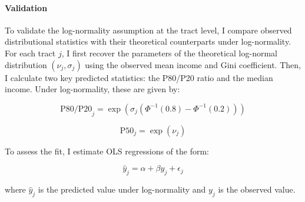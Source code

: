 \paragraph{Validation} To validate the log-normality assumption at the tract level, I compare observed distributional statistics with their theoretical counterparts under log-normality. For each tract $j$, I first recover the parameters of the theoretical log-normal distribution $(\nu_j, \sigma_j)$ using the observed mean income and Gini coefficient. Then, I calculate two key predicted statistics: the P80/P20 ratio and the median income. Under log-normality, these are given by:

\begin{equation}
\text{P80/P20}_j = \exp(\sigma_j(\Phi^{-1}(0.8) - \Phi^{-1}(0.2)))
\end{equation}

\begin{equation}
\text{P50}_j = \exp(\nu_j)
\end{equation}

To assess the fit, I estimate OLS regressions of the form:

\begin{equation}
\hat{y}_j = \alpha + \beta y_j + \epsilon_j
\end{equation}

where $\hat{y}_j$ is the predicted value under log-normality and $y_j$ is the observed value.